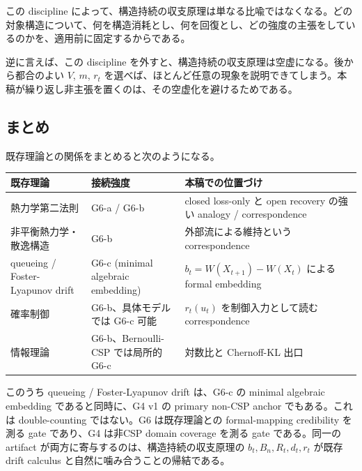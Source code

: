 \documentclass[12pt,a4paper]{article}
\begin{document}
この discipline によって、構造持続の収支原理は単なる比喩ではなくなる。どの対象構造について、何を構造消耗とし、何を回復とし、どの強度の主張をしているのかを、適用前に固定するからである。

逆に言えば、この discipline を外すと、構造持続の収支原理は空虚になる。後から都合のよい \(V\), \(m\), \(r_{t}\) を選べば、ほとんど任意の現象を説明できてしまう。本稿が繰り返し非主張を置くのは、その空虚化を避けるためである。

\subsection{まとめ}\label{ux307eux3068ux3081}

既存理論との関係をまとめると次のようになる。

{\def\LTcaptype{table} %
\begin{longtable}[]{@{}
  >{\raggedright\arraybackslash}p{}
  >{\raggedright\arraybackslash}p{}
  >{\raggedright\arraybackslash}p{}@{}}
\toprule\noalign{}
\begin{minipage}[b]{\linewidth}\raggedright
既存理論
\end{minipage} & \begin{minipage}[b]{\linewidth}\raggedright
接続強度
\end{minipage} & \begin{minipage}[b]{\linewidth}\raggedright
本稿での位置づけ
\end{minipage} \\
\midrule\noalign{}
\endhead
\bottomrule\noalign{}
\endlastfoot
熱力学第二法則 & G6-a / G6-b & closed loss-only と open recovery の強い analogy / correspondence \\
非平衡熱力学・散逸構造 & G6-b & 外部流による維持という correspondence \\
queueing / Foster-Lyapunov drift & G6-c (minimal algebraic embedding) & \(b_t=W(X_{t+1})-W(X_t)\) による formal embedding \\
確率制御 & G6-b、具体モデルでは G6-c 可能 & \(r_t(u_t)\) を制御入力として読む correspondence \\
情報理論 & G6-b、Bernoulli-CSP では局所的 G6-c & 対数比と Chernoff-KL 出口 \\
\end{longtable}
}

このうち queueing / Foster-Lyapunov drift は、G6-c の minimal algebraic embedding であると同時に、G4 v1 の primary non-CSP anchor でもある。これは double-counting ではない。G6 は既存理論との formal-mapping credibility を測る gate であり、G4 は非CSP domain coverage を測る gate である。同一の artifact が両方に寄与するのは、構造持続の収支原理の \(b_{t},B_{n},R_{t},d_{t},r_{t}\) が既存 drift calculus と自然に噛み合うことの帰結である。
\end{document}
